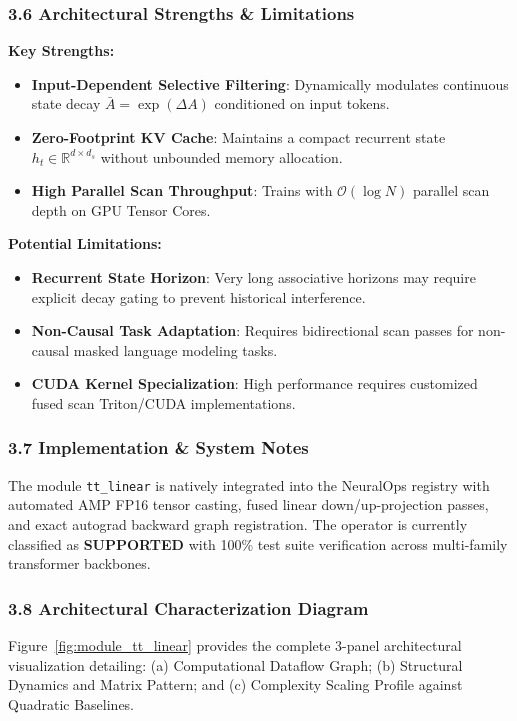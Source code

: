 \subsubsection*{3.6 Architectural Strengths \& Limitations}
\textbf{Key Strengths:}
\begin{itemize}
    \item \textbf{Input-Dependent Selective Filtering}: Dynamically modulates continuous state decay $\bar{A} = \exp(\Delta A)$ conditioned on input tokens.
    \item \textbf{Zero-Footprint KV Cache}: Maintains a compact recurrent state $h_t \in \mathbb{R}^{d \times d_s}$ without unbounded memory allocation.
    \item \textbf{High Parallel Scan Throughput}: Trains with $\mathcal{O}(\log N)$ parallel scan depth on GPU Tensor Cores.
\end{itemize}

\textbf{Potential Limitations:}
\begin{itemize}
    \item \textbf{Recurrent State Horizon}: Very long associative horizons may require explicit decay gating to prevent historical interference.
    \item \textbf{Non-Causal Task Adaptation}: Requires bidirectional scan passes for non-causal masked language modeling tasks.
    \item \textbf{CUDA Kernel Specialization}: High performance requires customized fused scan Triton/CUDA implementations.
\end{itemize}

\subsubsection*{3.7 Implementation \& System Notes}
The module \texttt{tt\_linear} is natively integrated into the NeuralOps registry with automated AMP FP16 tensor casting, fused linear down/up-projection passes, and exact autograd backward graph registration. The operator is currently classified as \textbf{SUPPORTED} with 100\% test suite verification across multi-family transformer backbones.

\subsubsection*{3.8 Architectural Characterization Diagram}
Figure~\ref{fig:module_tt_linear} provides the complete 3-panel architectural visualization detailing: (a) Computational Dataflow Graph; (b) Structural Dynamics and Matrix Pattern; and (c) Complexity Scaling Profile against Quadratic Baselines.

